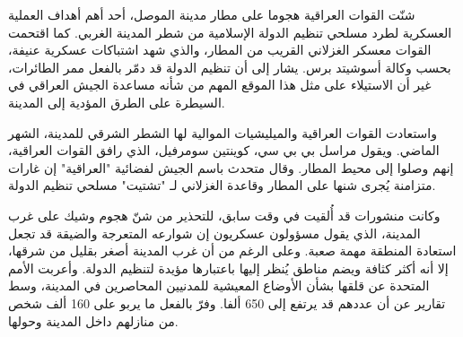 \documentclass[a5paper]{article}
\begin{document}
\vfill

\begin{multicols}{5}
	شنّت القوات العراقية هجوما على مطار مدينة الموصل، أحد أهم أهداف العملية العسكرية لطرد مسلحي تنظيم الدولة الإسلامية من شطر المدينة الغربي.  كما اقتحمت القوات معسكر الغزلاني القريب من المطار، والذي شهد اشتباكات عسكرية عنيفة، بحسب وكالة أسوشيتد برس.  يشار إلى أن تنظيم الدولة قد دمّر بالفعل ممر الطائرات، غير أن الاستيلاء على مثل هذا الموقع المهم من شأنه مساعدة الجيش العراقي في السيطرة على الطرق المؤدية إلى المدينة.

واستعادت القوات العراقية والميليشيات الموالية لها الشطر الشرقي للمدينة، الشهر الماضي.  ويقول مراسل بي بي سي، كوينتين سومرفيل، الذي رافق القوات العراقية، إنهم وصلوا إلى محيط المطار.  وقال متحدث باسم الجيش لفضائية "العراقية" إن غارات متزامنة يُجرى شنها على المطار وقاعدة الغزلاني لـ "تشتيت" مسلحي تنظيم الدولة.  

وكانت منشورات قد أُلقيت في وقت سابق، للتحذير من شنّ هجوم وشيك على غرب المدينة، الذي يقول مسؤولون عسكريون إن شوارعه المتعرجة والضيقة قد تجعل استعادة المنطقة مهمة صعبة. وعلى الرغم من أن غرب المدينة أصغر بقليل من شرقها، إلا أنه أكثر كثافة ويضم مناطق يُنظر إليها باعتبارها مؤيدة لتنظيم الدولة.  وأعربت الأمم المتحدة عن قلقها بشأن الأوضاع المعيشية للمدنيين المحاصرين في المدينة، وسط تقارير عن أن عددهم قد يرتفع إلى 650 ألفا.  وفرّ بالفعل ما يربو على 160 ألف شخص من منازلهم داخل المدينة وحولها.  
\end{multicols}

	
\end{document}
